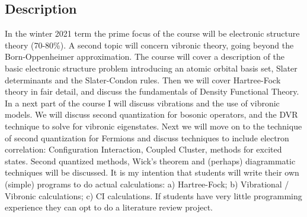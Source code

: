 \documentclass[a4paper, 12pt]{article}
\begin{document}
\subsection{Description}
In the winter 2021 term the prime focus of the course will be electronic structure theory (70-80\%). A second topic will concern vibronic theory, going beyond the Born-Oppenheimer approximation. The course will cover a description of the basic electronic structure problem introducing an atomic orbital basis set, Slater determinants and the Slater-Condon rules. Then we will cover Hartree-Fock theory in fair detail, and discuss the fundamentals of Density Functional Theory. In a next part of the course I will discuss vibrations and the use of vibronic models. We will discuss second quantization for bosonic operators, and the DVR technique to solve for vibronic eigenstates. Next we will move on to the technique of second quantization for Fermions and discuss techniques to include electron correlation: Configuration Interaction, Coupled Cluster, methods for excited states. Second quantized methods, Wick’s theorem and (perhaps) diagrammatic techniques will be discussed. It is my intention that students will write their own (simple) programs to do actual calculations: a) Hartree-Fock; b) Vibrational / Vibronic calculations; c) CI calculations. If students have very little programming experience they can opt to do a literature review project.
\end{document}

